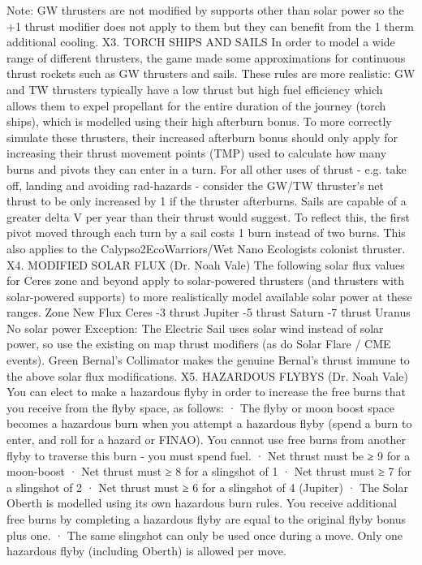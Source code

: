 \documentclass[a4paper]{book}
\begin{document}
Note: GW thrusters are not modified by supports other than solar power so the +1 thrust modifier does not apply to them but they can benefit from the 1 therm additional cooling.
X3. TORCH SHIPS AND SAILS
In order to model a wide range of different thrusters, the game made some approximations for continuous thrust rockets such as GW thrusters and sails. These rules are more realistic:
GW and TW thrusters typically have a low thrust but high fuel efficiency which allows them to expel propellant for the entire duration of the journey (torch ships), which is modelled using their high afterburn bonus. To more correctly simulate these thrusters, their increased afterburn bonus should only apply for increasing their thrust movement points (TMP) used to calculate how many burns and pivots they can enter in a turn. For all other uses of thrust - e.g. take off, landing and avoiding rad-hazards - consider the GW/TW thruster’s net thrust to be only increased by 1 if the thruster afterburns.
Sails are capable of a greater delta V per year than their thrust would suggest. To reflect this, the first pivot moved through each turn by a sail costs 1 burn instead of two burns. This also applies to the Calypso2EcoWarriors/Wet Nano Ecologists colonist thruster.
X4. MODIFIED SOLAR FLUX (Dr. Noah Vale)
The following solar flux values for Ceres zone and beyond apply to solar-powered thrusters (and thrusters with solar-powered supports) to more realistically model available solar power at these ranges.
Zone
New Flux
Ceres
-3 thrust
Jupiter
-5 thrust
Saturn
-7 thrust
Uranus
No solar power
Exception: The Electric Sail uses solar wind instead of solar power, so use the existing on map thrust modifiers (as do Solar Flare / CME events). Green Bernal’s Collimator makes the genuine Bernal’s thrust immune to the above solar flux modifications.
X5. HAZARDOUS FLYBYS (Dr. Noah Vale)
You can elect to make a hazardous flyby in order to increase the free burns that you receive from the flyby space, as follows:
·       The flyby or moon boost space becomes a hazardous burn when you attempt a hazardous flyby (spend a burn to enter, and roll for a hazard or FINAO). You cannot use free burns from another flyby to traverse this burn - you must spend fuel.
·       Net thrust must be ≥ 9 for a moon-boost
·       Net thrust must ≥ 8 for a slingshot of 1
·       Net thrust must ≥ 7 for a slingshot of 2
·       Net thrust must ≥ 6 for a slingshot of 4 (Jupiter)
·       The Solar Oberth is modelled using its own hazardous burn rules.       You receive additional free burns by completing a hazardous flyby are equal to the original flyby bonus plus one.
·       The same slingshot can only be used once during a move. Only one hazardous flyby (including Oberth) is allowed per move.
\end{document}
